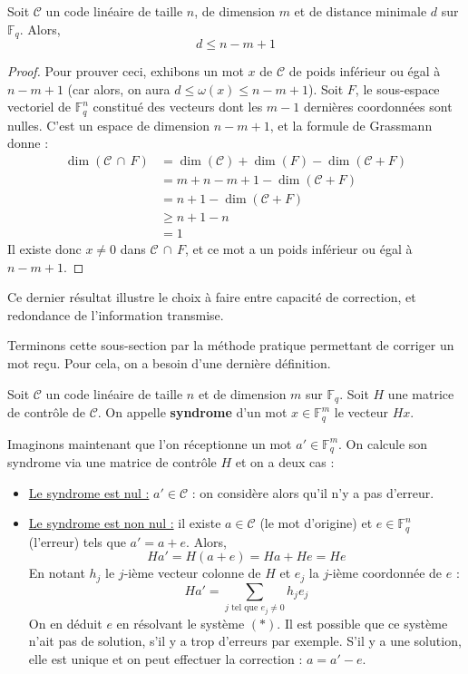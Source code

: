 	\begin{proposition}
		Soit $\mathcal{C}$ un code linéaire de taille $n$, de dimension $m$ et de distance minimale $d$ sur $\mathbb{F}_q$. Alors,
		\[ d \leq n-m+1 \]
	\end{proposition}
	
	\begin{proof}
		Pour prouver ceci, exhibons un mot $x$ de $\mathcal{C}$ de poids inférieur ou égal à $n-m+1$ (car alors, on aura $d \leq \omega(x) \leq n-m+1$). Soit $F$, le sous-espace vectoriel de $\mathbb{F}_q^n$ constitué des vecteurs dont les $m-1$ dernières coordonnées sont nulles. C'est un espace de dimension $n-m+1$, et la formule de Grassmann donne :
		\begin{align*}
			\dim(\mathcal{C} \, \cap \, F) &= \dim(\mathcal{C}) + \dim(F) - \dim(\mathcal{C} + F) \\
			&= m + n - m + 1 - \dim(\mathcal{C} + F) \\
			&= n + 1 - \dim(\mathcal{C} + F) \\
			&\geq n + 1 - n \\
			&= 1
		\end{align*}
		Il existe donc $x \neq 0$ dans $\mathcal{C} \, \cap \, F$, et ce mot a un poids inférieur ou égal à $n-m+1$.
	\end{proof}
	
	Ce dernier résultat illustre le choix à faire entre capacité de correction, et redondance de l'information transmise.
	
	Terminons cette sous-section par la méthode pratique permettant de corriger un mot reçu. Pour cela, on a besoin d'une dernière définition.
	
	\begin{definition}
		Soit $\mathcal{C}$ un code linéaire de taille $n$ et de dimension $m$ sur $\mathbb{F}_q$. Soit $H$ une matrice de contrôle de $\mathcal{C}$. On appelle \textbf{syndrome} d'un mot $x \in \mathbb{F}_q^m$ le vecteur $Hx$.
	\end{definition}
	
	Imaginons maintenant que l'on réceptionne un mot $a' \in \mathbb{F}_q^m$. On calcule son syndrome via une matrice de contrôle $H$ et on a deux cas :
	
	\begin{itemize}
		\item \underline{Le syndrome est nul :} $a' \in \mathcal{C}$ : on considère alors qu'il n'y a pas d'erreur.
		\item \underline{Le syndrome est non nul :} il existe $a \in \mathcal{C}$ (le mot d'origine) et $e \in \mathbb{F}_q^n$ (l'erreur) tels que $a' = a + e$. Alors,
		\[ Ha' = H(a+e) = Ha + He = He \]
		En notant $h_j$ le $j$-ième vecteur colonne de $H$ et $e_j$ la $j$-ième coordonnée de $e$ :
		\[ Ha' = \sum_{j \text{ tel que } e_j \neq 0} h_j e_j \tag{$*$} \]
		On en déduit $e$ en résolvant le système $(*)$. Il est possible que ce système n'ait pas de solution, s'il y a trop d'erreurs par exemple. S'il y a une solution, elle est unique et on peut effectuer la correction : $a = a' - e$.
	\end{itemize}
	
